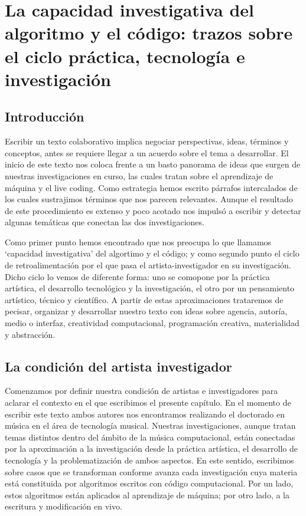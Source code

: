 \chapter{La capacidad investigativa del algoritmo y el código: trazos sobre el ciclo práctica, tecnología e investigación}

\author{Aaron Castañeda y Hernani Villaseñor}

\section{Introducción}
Escribir un texto colaborativo implica negociar perspectivas, ideas, términos y conceptos, antes se requiere llegar a un acuerdo sobre el tema a desarrollar. El inicio de este texto nos coloca frente a un basto panorama de ideas que surgen de nuestras investigaciones en curso, las cuales tratan sobre el aprendizaje de máquina y el live coding. Como estrategia hemos escrito párrafos intercalados de los cuales sustrajimos términos que nos parecen relevantes. Aunque el resultado de este procedimiento es extenso y poco acotado nos impulsó a escribir y detectar algunas temáticas que conectan las dos investigaciones.

Como primer punto hemos encontrado que nos preocupa lo que llamamos ‘capacidad investigativa’ del algortimo y el código; y como segundo punto el ciclo de retroalimentación por el que pasa el artista-investigador en su investigación. Dicho ciclo lo vemos de diferente forma: uno se comopone por la práctica artística, el desarrollo tecnológico y la investigación, el otro por un pensamiento artístico, técnico y científico. A partir de estas aproximaciones trataremos de pecisar, organizar y desarrollar nuestro texto con ideas sobre agencia, autoría, medio o interfaz, creatividad computacional, programación creativa, materialidad y abstracción.

\section{La condición del artista investigador}
Comenzamos por definir nuestra condición de artistas e investigadores para aclarar el contexto en el que escribimos el presente capítulo. En el momento de escribir este texto ambos autores nos encontramos realizando el doctorado en música en el área de tecnología musical. Nuestras investigaciones, aunque tratan temas distintos dentro del ámbito de la música computacional, están conectadas por la aproximación a la investigación desde la práctica artística, el desarrollo de tecnología y la problematización de ambos aspectos. En este sentido, escribimos sobre casos que se transforman conforme avanza cada investigación cuya materia está constituida por algoritmos escritos con código computacional. Por un lado, estos algoritmos están aplicados al aprendizaje de máquina; por otro lado, a la escritura y modificación en vivo.

